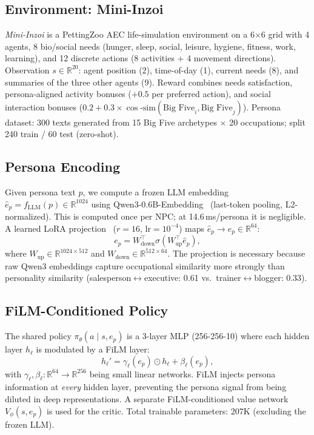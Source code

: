 \documentclass{article}
\begin{document}
\subsection{Environment: Mini-Inzoi}
\label{sec:env}

\textit{Mini-Inzoi} is a PettingZoo AEC life-simulation environment on a
6$\times$6 grid with 4 agents, 8 bio/social needs (hunger, sleep, social,
leisure, hygiene, fitness, work, learning), and 12 discrete actions
(8 activities + 4 movement directions).
Observation $s\!\in\!\mathbb{R}^{20}$: agent position (2), time-of-day (1),
current needs (8), and summaries of the three other agents (9).
Reward combines needs satisfaction, persona-aligned activity bonuses
($+0.5$ per preferred action), and social interaction bonuses
($0.2\!+\!0.3\!\times\!\cos\!\text{-sim}(\text{Big Five}_i, \text{Big Five}_j)$).
Persona dataset: 300 texts generated from 15 Big Five archetypes $\times$ 20
occupations; split 240 train / 60 test (zero-shot).

\subsection{Persona Encoding}
\label{sec:encoding}

Given persona text $p$, we compute a frozen LLM embedding
$\hat{e}_p = f_{\text{LLM}}(p) \in \mathbb{R}^{1024}$ using
Qwen3-0.6B-Embedding~\citep{qwen3embed} (last-token pooling, L2-normalized).
This is computed once per NPC; at 14.6\,ms/persona it is negligible.
A learned LoRA projection~\citep{hu2022lora} ($r\!=\!16$, $\text{lr}\!=\!10^{-4}$)
maps $\hat{e}_p \to e_p \in \mathbb{R}^{64}$:
\[
  e_p = W_{\text{down}}^{\top} \sigma\!\left(W_{\text{up}}^{\top} \hat{e}_p\right),
\]
where $W_{\text{up}} \in \mathbb{R}^{1024\times 512}$ and
$W_{\text{down}} \in \mathbb{R}^{512\times 64}$.
The projection is necessary because raw Qwen3 embeddings capture occupational
similarity more strongly than personality similarity
(salesperson$\leftrightarrow$executive: 0.61 vs.\ trainer$\leftrightarrow$blogger: 0.33).

\subsection{FiLM-Conditioned Policy}
\label{sec:film}

The shared policy $\pi_\theta(a \mid s, e_p)$ is a 3-layer MLP (256-256-10)
where each hidden layer $h_\ell$ is modulated by a FiLM layer:
\[
  h_\ell' = \gamma_\ell(e_p) \odot h_\ell + \beta_\ell(e_p),
\]
with $\gamma_\ell, \beta_\ell\!: \mathbb{R}^{64} \to \mathbb{R}^{256}$ being
small linear networks.
FiLM injects persona information at \emph{every} hidden layer, preventing
the persona signal from being diluted in deep representations.
A separate FiLM-conditioned value network $V_\phi(s, e_p)$ is used for the
critic.
Total trainable parameters: 207K (excluding the frozen LLM).
\end{document}
